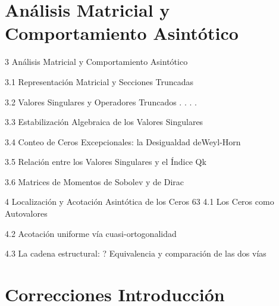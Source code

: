 \documentclass[12pt,a4paper]{article}
\theoremstyle{definition}
\theoremstyle{remark}
\begin{document}
\section{ Análisis Matricial y Comportamiento Asintótico}
3 Análisis Matricial y Comportamiento Asintótico

3.1 Representación Matricial y Secciones Truncadas


3.2 Valores Singulares y Operadores Truncados . . . . 


3.3 Estabilización Algebraica de los Valores Singulares 


3.4 Conteo de Ceros Excepcionales: la Desigualdad deWeyl-Horn 


3.5 Relación entre los Valores Singulares y el Índice Qk 


3.6 Matrices de Momentos de Sobolev y de Dirac


4 Localización y Acotación Asintótica de los Ceros 63
4.1 Los Ceros como Autovalores 


4.2 Acotación uniforme vía cuasi-ortogonalidad 


4.3 La cadena estructural: ?  Equivalencia y comparación de las dos vías 



\section{Correcciones Introducción}
\end{document}
